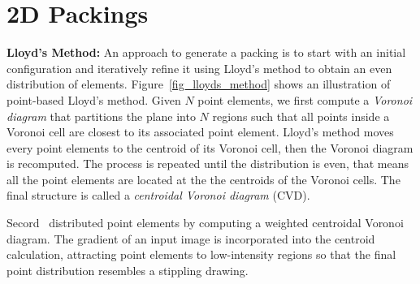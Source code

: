 \section{2D Packings}


\newtext
{
\textbf{Lloyd's Method:}
An approach to generate a packing is to start with an initial configuration and iteratively refine it using Lloyd's method
to obtain an even distribution of elements. 
Figure~\ref{fig_lloyds_method} shows an illustration of point-based Lloyd's method.
Given $N$ point elements, 
we first compute a \textit{Voronoi diagram} that partitions the plane into $N$ regions such that
all points inside a Voronoi cell are closest to its associated point element.
Lloyd's method moves every point elements to the centroid of its Voronoi cell, 
then the Voronoi diagram is recomputed.
The process is repeated until the distribution is even,
that means all the point elements are located at the the centroids of the Voronoi cells.
The final structure is called a \textit{centroidal Voronoi diagram} (CVD).
}

\newtext
{
Secord~\cite{Secord2002} distributed point elements by computing a weighted centroidal Voronoi diagram.
The gradient of an input image is incorporated into the centroid calculation, 
attracting point elements to low-intensity regions so that
the final point distribution resembles a stippling drawing.
}


